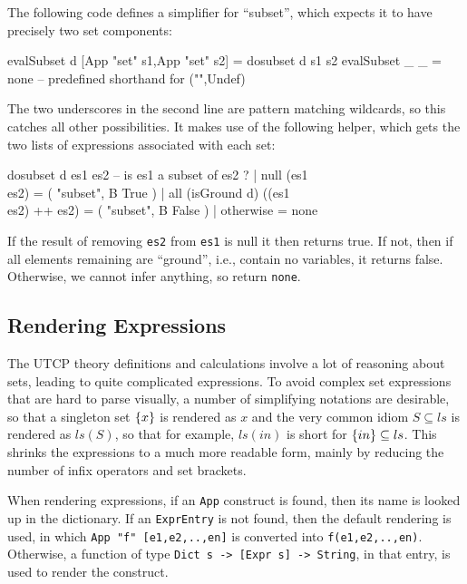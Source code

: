 The following code defines a simplifier for ``subset'',
which expects it to have precisely two set components:
\begin{code}
evalSubset d [App "set" s1,App "set" s2] = dosubset d s1 s2
evalSubset _ _ = none -- predefined shorthand for ("",Undef)
\end{code}
The two underscores in the second line are pattern matching
wildcards, so this catches all other possibilities.
It makes use of the following helper,
which gets the two lists of expressions associated with each set:
\begin{code}
dosubset d es1 es2 -- is es1 a subset of es2 ?
  | null (es1 \\ es2)  =  ( "subset", B True )
  | all (isGround d) ((es1 \\ es2) ++ es2)
                       =  ( "subset", B False )
  | otherwise          =  none
\end{code}
If the result of removing \texttt{es2} from \texttt{es1} is null
it then returns true.
If not, then if all elements remaining are ``ground'',
i.e., contain no variables, it returns false.
Otherwise, we cannot infer anything, so return \texttt{none}.

\subsection{Rendering Expressions}

The UTCP theory definitions and calculations
involve a lot of reasoning about sets,
leading to quite complicated expressions.
To avoid complex set expressions that are hard to parse visually,
a number of simplifying notations are desirable,
so that a singleton set $\{{x}\}$ is rendered as $x$
and the very common idiom $S \subseteq ls$
is rendered as $ls(S)$,
so that for example, $ls(in)$ is short for $\{{in}\} \subseteq ls$.
This shrinks the expressions to a much more readable form,
mainly by reducing the number of infix operators and set brackets.


When rendering expressions,
if an \texttt{App} construct is found, then its name
is looked up in the dictionary.
If an \texttt{ExprEntry} is not found, then the default rendering is used,
in which \verb$App "f" [e1,e2,..,en]$
is converted into \verb$f(e1,e2,..,en)$.
Otherwise, a function of type \verb$Dict s -> [Expr s] -> String$,
in that entry, is used to render the construct.

